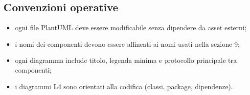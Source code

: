 \documentclass[a4paper, 11pt, oneside]{scrartcl}
\begin{document}
\subsection{Convenzioni operative}
\begin{itemize}
    \item ogni file PlantUML deve essere modificabile senza dipendere da asset esterni;
    \item i nomi dei componenti devono essere allineati ai nomi usati nella sezione 9;
    \item ogni diagramma include titolo, legenda minima e protocollo principale tra componenti;
    \item i diagrammi L4 sono orientati alla codifica (classi, package, dipendenze).
\end{itemize}
\end{document}
